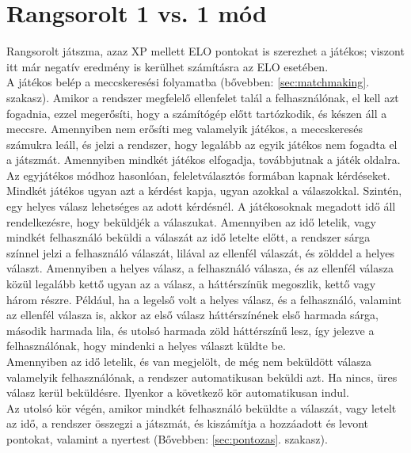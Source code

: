 \section{Rangsorolt 1 vs. 1 mód}
Rangsorolt játszma, azaz XP mellett ELO pontokat is szerezhet a játékos; viszont itt már negatív eredmény is kerülhet számításra az ELO esetében.
\\
A játékos belép a meccskeresési folyamatba (bővebben: \ref{sec:matchmaking}. szakasz). Amikor a rendszer megfelelő ellenfelet talál a felhasználónak, el kell azt fogadnia, ezzel megerősíti, hogy a számítógép előtt tartózkodik, és készen áll a meccsre. Amennyiben nem erősíti meg valamelyik játékos, a meccskeresés számukra leáll, és jelzi a rendszer, hogy legalább az egyik játékos nem fogadta el a játszmát. Amennyiben mindkét játékos elfogadja, továbbjutnak a játék oldalra.
\\
Az egyjátékos módhoz hasonlóan, feleletválasztós formában kapnak kérdéseket. Mindkét játékos ugyan azt a kérdést kapja, ugyan azokkal a válaszokkal. Szintén, egy helyes válasz lehetséges az adott kérdésnél. A játékosoknak megadott idő áll rendelkezésre, hogy beküldjék a válaszukat. Amennyiben az idő letelik, vagy mindkét felhasználó beküldi a válaszát az idő letelte előtt, a rendszer sárga színnel jelzi a felhasználó válaszát, lilával az ellenfél válaszát, és zölddel a helyes választ. Amennyiben a helyes válasz, a felhasználó válasza, és az ellenfél válasza közül legalább kettő ugyan az a válasz, a háttérszínük megoszlik, kettő vagy három részre. Például, ha a legelső volt a helyes válasz, és a felhasználó, valamint az ellenfél válasza is, akkor az első válasz háttérszínének első harmada sárga, második harmada lila, és utolsó harmada zöld háttérszínű lesz, így jelezve a felhasználónak, hogy mindenki a helyes választ küldte be.
\\
Amennyiben az idő letelik, és van megjelölt, de még nem beküldött válasza valamelyik felhasználónak, a rendszer automatikusan beküldi azt. Ha nincs, üres válasz kerül beküldésre. Ilyenkor a következő kör automatikusan indul.
\\
Az utolsó kör végén, amikor mindkét felhasználó beküldte a válaszát, vagy letelt az idő, a rendszer összegzi a játszmát, és kiszámítja a hozzáadott és levont pontokat, valamint a nyertest (Bővebben: \ref{sec:pontozas}. szakasz).

\newpage
